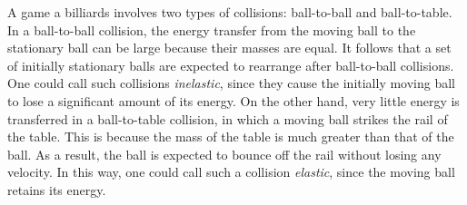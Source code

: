 \documentclass{article}
\begin{document}
A game a billiards involves two types of collisions: ball-to-ball and ball-to-table. In a ball-to-ball collision, the energy transfer from the moving ball to the stationary ball can be large because their masses are equal.  It follows that a set of initially stationary balls are expected to rearrange after ball-to-ball collisions.  One could call such collisions \textit{inelastic}, since they cause the initially moving ball to lose a significant amount of its energy.
On the other hand, very little energy is transferred in a ball-to-table collision, in which a moving ball strikes the rail of the table.  This is because the mass of the table is much greater than that of the ball.  As a result, the ball is expected to bounce off the rail without losing any velocity.  In this way, one could call such a collision \textit{elastic}, since the moving ball retains its energy.
\end{document}
